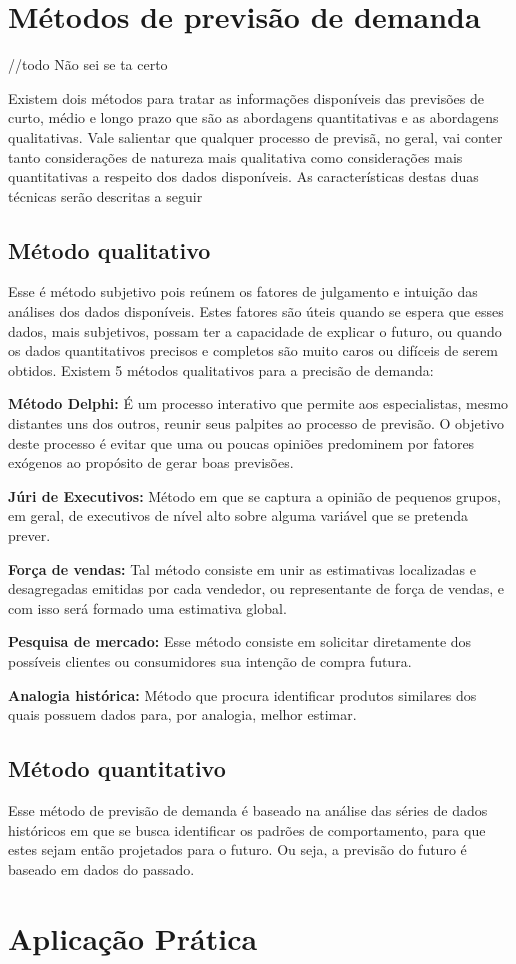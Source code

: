 \section{Métodos de previsão de demanda}
//todo Não sei se ta certo

Existem dois métodos para tratar as informações disponíveis das previsões de curto, médio e longo prazo que são as abordagens quantitativas e as abordagens qualitativas. Vale salientar que qualquer processo de previsã, no geral, vai conter tanto considerações de natureza mais qualitativa como considerações mais quantitativas a respeito dos dados disponíveis. As características destas duas técnicas serão descritas a seguir

\subsection{Método qualitativo}

Esse é método subjetivo pois reúnem os fatores de julgamento e intuição das análises dos dados disponíveis. Estes fatores são úteis quando se espera que esses dados, mais subjetivos, possam ter a capacidade de explicar o futuro, ou quando os dados quantitativos precisos e completos são muito caros ou difíceis de serem obtidos. Existem 5 métodos qualitativos para a precisão de demanda:

\textbf{Método Delphi:} É um processo interativo que permite aos especialistas, mesmo distantes uns dos outros, reunir seus palpites ao processo de previsão. O objetivo deste processo é evitar que uma ou poucas opiniões predominem por fatores exógenos ao propósito de gerar boas previsões.

\textbf{Júri de Executivos:} Método em que se captura a opinião de pequenos grupos, em geral, de executivos de nível alto sobre alguma variável que se pretenda prever.

\textbf{Força de vendas:} Tal método consiste em unir as estimativas localizadas e desagregadas emitidas por cada vendedor, ou representante de força de vendas, e com isso será formado uma estimativa global.

\textbf{Pesquisa de mercado:} Esse método consiste em solicitar diretamente dos possíveis clientes ou consumidores sua intenção de compra futura.

\textbf{Analogia histórica:} Método que procura identificar produtos similares dos quais possuem dados para, por analogia, melhor estimar.

\subsection{Método quantitativo}

Esse método de previsão de demanda é baseado na análise das séries de dados históricos em que se busca identificar os padrões de comportamento, para que estes sejam então projetados para o futuro. Ou seja, a previsão do futuro é baseado em dados do passado.

\section{Aplicação Prática}
\label{sec:introducao_ao_planejamento_aplicacao}
